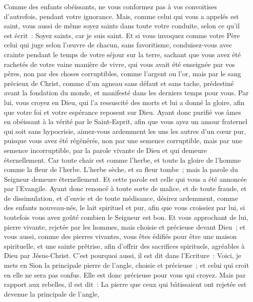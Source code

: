 \begin{multicols}{2}
Comme des enfants obéissants, ne vous conformez pas à vos convoitises d'autrefois, pendant votre ignorance. 
Mais, comme celui qui vous a appelés est saint, vous aussi de même soyez saints dans toute votre conduite,
selon ce qu'il est écrit~: Soyez saints, car je suis saint.
Et si vous invoquez comme votre Père celui qui juge selon l'œuvre de chacun, sans favoritisme, conduisez-vous avec crainte pendant le temps de votre séjour sur la terre,
sachant que vous avez été rachetés de votre vaine manière de vivre, qui vous avait été enseignée par vos pères, non  par des choses corruptibles, comme l'argent ou l'or,
mais par le sang précieux de Christ, comme d'un agneau sans défaut et sans tache,
prédestiné avant la fondation du monde, et manifesté dans les derniers temps pour vous.
Par lui, vous croyez en Dieu, qui l'a ressuscité des morts et lui a donné la gloire, afin que votre foi et votre espérance reposent sur Dieu.
Ayant donc purifié vos âmes en obéissant à la vérité par le Saint-Esprit, afin que vous ayez un amour fraternel qui soit sans hypocrisie, aimez-vous ardemment les uns les autres d'un cœur pur,
puisque vous avez été régénérés, non par une semence corruptible, mais par une semence incorruptible, par la parole vivante de Dieu et qui demeure éternellement.
Car toute chair est comme l'herbe, et toute la gloire de l'homme comme la fleur de l'herbe. L'herbe sèche, et sa fleur tombe~;
mais la parole du Seigneur demeure éternellement. Et cette parole est celle qui vous a été annoncée par l'Evangile.
\VerseOne{}Ayant donc renoncé à toute sorte de malice, et de toute fraude, et de dissimulation, et d'envie et de toute médisance,
désirez ardemment, comme des enfants nouveau-nés, le lait spirituel et pur, afin que vous croissiez par lui,
si toutefois vous avez goûté combien le Seigneur est bon.
Et vous approchant de lui, pierre vivante, rejetée par les hommes, mais choisie et précieuse devant Dieu~;
et vous aussi, comme des pierres vivantes, vous êtes édifiés pour être une maison spirituelle, et une sainte prêtrise, afin d'offrir des sacrifices spirituels, agréables à Dieu par Jésus-Christ. 
C'est pourquoi aussi, il est dit dans l'Ecriture~: Voici, je mets en Sion la principale pierre de l'angle, choisie et précieuse~; et celui qui croit en elle ne sera pas confus.
Elle est donc précieuse pour vous qui croyez. Mais par rapport aux rebelles, il est dit~: La pierre que ceux qui bâtissaient ont rejetée est devenue la principale de l'angle, 

\end{multicols}
